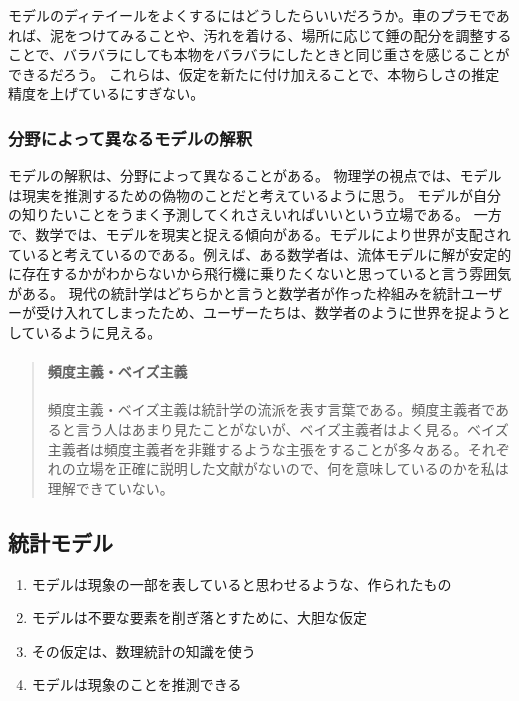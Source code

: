 \documentclass[a4paper,11pt,dvipdfmx]{jsarticle}
\begin{document}
モデルのディテイールをよくするにはどうしたらいいだろうか。車のプラモであれば、泥をつけてみることや、汚れを着ける、場所に応じて錘の配分を調整することで、バラバラにしても本物をバラバラにしたときと同じ重さを感じることができるだろう。
これらは、仮定を新たに付け加えることで、本物らしさの推定精度を上げているにすぎない。

\subsubsection{分野によって異なるモデルの解釈}
モデルの解釈は、分野によって異なることがある。
物理学の視点では、モデルは現実を推測するための偽物のことだと考えているように思う。
モデルが自分の知りたいことをうまく予測してくれさえいればいいという立場である。
一方で、数学では、モデルを現実と捉える傾向がある。モデルにより世界が支配されていると考えているのである。例えば、ある数学者は、流体モデルに解が安定的に存在するかがわからないから飛行機に乗りたくないと思っていると言う雰囲気がある。
現代の統計学はどちらかと言うと数学者が作った枠組みを統計ユーザーが受け入れてしまったため、ユーザーたちは、数学者のように世界を捉ようとしているように見える。


\begin{mybox}
    \begin{quotation}
    \paragraph{頻度主義・ベイズ主義}
    頻度主義・ベイズ主義は統計学の流派を表す言葉である。頻度主義者であると言う人はあまり見たことがないが、ベイズ主義者はよく見る。ベイズ主義者は頻度主義者を非難するような主張をすることが多々ある。それぞれの立場を正確に説明した文献がないので、何を意味しているのかを私は理解できていない。
    \end{quotation}
\end{mybox}


\subsection{統計モデル}
\begin{enumerate}
    \item モデルは現象の一部を表していると思わせるような、作られたもの
    \item モデルは不要な要素を削ぎ落とすために、大胆な仮定
    \item その仮定は、数理統計の知識を使う
    \item モデルは現象のことを推測できる
\end{enumerate}
\end{document}
